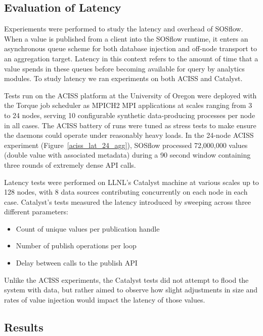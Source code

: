 \subsection{Evaluation of Latency} %
Experiements were performed to study the latency and overhead of
SOSflow.
%
When a value is published from a client into the SOSflow runtime,
it enters an asynchronous queue scheme for both database injection
and off-node transport to an aggregation target.
%
Latency in this context refers to the amount of time that a value
spends in these queues before becoming available for query by
analytics modules.
%
To study latency we ran experiments on both ACISS and Catalyst.
% 
\par
%
Tests run on the ACISS platform at the University of Oregon were
deployed with the Torque job scheduler as MPICH2 MPI applications at
scales ranging from 3 to 24 nodes, serving 10 configurable synthetic
data-producing processes per node in all cases.
%
The ACISS battery of runs were tuned as stress tests to make ensure
the daemons could operate under reasonably heavy loads.
%
In the 24-node ACISS experiment (Figure~\ref{aciss_lat_24_agg}),
SOSflow processed 72,000,000 values (double value with associated
metadata) during a 90 second window containing three rounds of
extremely dense API calls.
%
\par
%
Latency tests were performed on LLNL's Catalyst machine at
various scales up to 128 nodes, with 8 data sources contributing
concurrently on each node in each case.
%
Catalyst's tests measured the latency introduced by sweeping across three
different parameters:
\begin{itemize}
\item Count of unique values per publication handle
\item Number of publish operations per loop
\item Delay between calls to the publish API
\end{itemize}
%
Unlike the ACISS experiments, the Catalyst tests did not attempt to
flood the system with data, but rather aimed to observe how slight
adjustments in size and rates of value injection would impact the
latency of those values.
%
%




\subsection{Results} %
%
%
